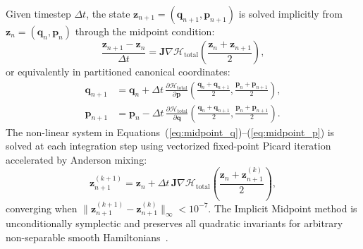 \documentclass[preprint,12pt,3p]{elsarticle}
\begin{document}
Given timestep $\Delta t$, the state $\bm{z}_{n+1} = (\bm{q}_{n+1}, \bm{p}_{n+1})$ is solved implicitly from $\bm{z}_n = (\bm{q}_n, \bm{p}_n)$ through the midpoint condition:
\begin{equation}
\frac{\bm{z}_{n+1} - \bm{z}_n}{\Delta t} = \bm{J} \nabla \mathcal{H}_{\mathrm{total}}\left( \frac{\bm{z}_n + \bm{z}_{n+1}}{2} \right),
\label{eq:implicit_midpoint}
\end{equation}
or equivalently in partitioned canonical coordinates:
\begin{align}
\bm{q}_{n+1} &= \bm{q}_n + \Delta t \, \frac{\partial \mathcal{H}_{\mathrm{total}}}{\partial \bm{p}}\left( \frac{\bm{q}_n + \bm{q}_{n+1}}{2}, \frac{\bm{p}_n + \bm{p}_{n+1}}{2} \right), \label{eq:midpoint_q} \\
\bm{p}_{n+1} &= \bm{p}_n - \Delta t \, \frac{\partial \mathcal{H}_{\mathrm{total}}}{\partial \bm{q}}\left( \frac{\bm{q}_n + \bm{q}_{n+1}}{2}, \frac{\bm{p}_n + \bm{p}_{n+1}}{2} \right). \label{eq:midpoint_p}
\end{align}
The non-linear system in Equations~(\ref{eq:midpoint_q})--(\ref{eq:midpoint_p}) is solved at each integration step using vectorized fixed-point Picard iteration accelerated by Anderson mixing:
\begin{equation}
\bm{z}_{n+1}^{(k+1)} = \bm{z}_n + \Delta t \, \bm{J} \nabla \mathcal{H}_{\mathrm{total}}\left( \frac{\bm{z}_n + \bm{z}_{n+1}^{(k)}}{2} \right),
\label{eq:picard_iteration}
\end{equation}
converging when $\|\bm{z}_{n+1}^{(k+1)} - \bm{z}_{n+1}^{(k)}\|_{\infty} < 10^{-7}$. The Implicit Midpoint method is unconditionally symplectic and preserves all quadratic invariants for arbitrary non-separable smooth Hamiltonians~\cite{hairster2006geometric}.
\end{document}
